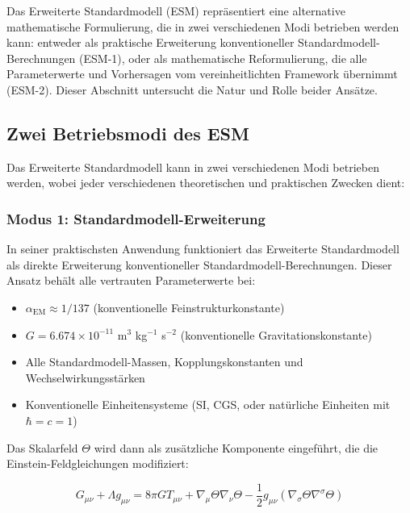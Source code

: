 \documentclass[12pt,a4paper]{article}
\newcommand{\alphaEM}{\alpha_{\text{EM}}}
\begin{document}
	Das Erweiterte Standardmodell (ESM) repräsentiert eine alternative mathematische Formulierung, die in zwei verschiedenen Modi betrieben werden kann: entweder als praktische Erweiterung konventioneller Standardmodell-Berechnungen (ESM-1), oder als mathematische Reformulierung, die alle Parameterwerte und Vorhersagen vom vereinheitlichten Framework übernimmt (ESM-2). Dieser Abschnitt untersucht die Natur und Rolle beider Ansätze.
	
	\subsection{Zwei Betriebsmodi des ESM}
	\label{subsec:two_operational_modes}
	
	Das Erweiterte Standardmodell kann in zwei verschiedenen Modi betrieben werden, wobei jeder verschiedenen theoretischen und praktischen Zwecken dient:
	
	\subsubsection{Modus 1: Standardmodell-Erweiterung}
	\label{subsubsec:mode1_sm_extension}
	
	In seiner praktischsten Anwendung funktioniert das Erweiterte Standardmodell als direkte Erweiterung konventioneller Standardmodell-Berechnungen. Dieser Ansatz behält alle vertrauten Parameterwerte bei:
	
	\begin{itemize}
		\item $\alphaEM \approx 1/137$ (konventionelle Feinstrukturkonstante)
		\item $G = 6.674 \times 10^{-11}$ m$^3$ kg$^{-1}$ s$^{-2}$ (konventionelle Gravitationskonstante)
		\item Alle Standardmodell-Massen, Kopplungskonstanten und Wechselwirkungsstärken
		\item Konventionelle Einheitensysteme (SI, CGS, oder natürliche Einheiten mit $\hbar = c = 1$)
	\end{itemize}
	
	Das Skalarfeld $\Theta$ wird dann als zusätzliche Komponente eingeführt, die die Einstein-Feldgleichungen modifiziert:
	
	\begin{equation}
		G_{\mu\nu} + \Lambda g_{\mu\nu} = 8\pi G T_{\mu\nu} + \nabla_{\mu}\Theta\nabla_{\nu}\Theta - \frac{1}{2}g_{\mu\nu}(\nabla_{\sigma}\Theta\nabla^{\sigma}\Theta)
	\end{equation}
	
\end{document}
